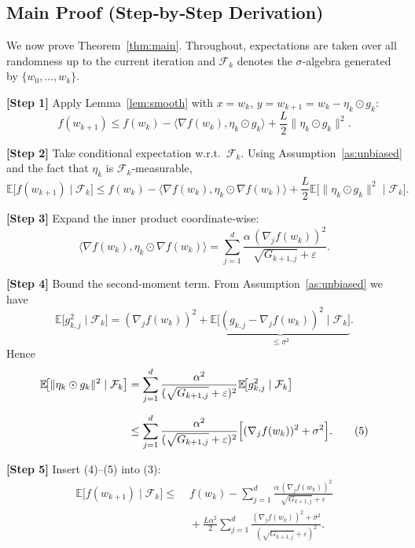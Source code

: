 \documentclass{article}
\newcommand{\E}{\mathbb{E}}
\begin{document}
\subsection*{Main Proof (Step‑by‑Step Derivation)}
We now prove Theorem~\ref{thm:main}.  Throughout, expectations are taken over all
randomness up to the current iteration and $\mathcal{F}_{k}$ denotes the
$\sigma$‑algebra generated by $\{w_{0},\dots,w_{k}\}$.

\noindent\textbf{[Step 1]} Apply Lemma~\ref{lem:smooth} with $x=w_{k}$,
$y=w_{k+1}=w_{k}-\eta_{k}\odot g_{k}$:
\[
f(w_{k+1})\le f(w_{k})-\langle\nabla f(w_{k}),\eta_{k}\odot g_{k}\rangle
      +\frac{L}{2}\|\eta_{k}\odot g_{k}\|^{2}.                                   \tag{2}
\]

\noindent\textbf{[Step 2]} Take conditional expectation w.r.t.\ $\mathcal{F}_{k}$.
Using Assumption~\ref{as:unbiased} and the fact that $\eta_{k}$ is $\mathcal{F}_{k}$‑measurable,
\[
\E\!\bigl[f(w_{k+1})\mid\mathcal{F}_{k}\bigr]
\le f(w_{k})
    -\langle\nabla f(w_{k}),\eta_{k}\odot\nabla f(w_{k})\rangle
    +\frac{L}{2}\E\!\bigl[\|\eta_{k}\odot g_{k}\|^{2}\mid\mathcal{F}_{k}\bigr].
                                                                    \tag{3}
\]

\noindent\textbf{[Step 3]} Expand the inner product coordinate‑wise:
\[
\langle\nabla f(w_{k}),\eta_{k}\odot\nabla f(w_{k})\rangle
   =\sum_{j=1}^{d}\frac{\alpha\,(\nabla_{j}f(w_{k}))^{2}}
                {\sqrt{G_{k+1,j}}+\varepsilon}.                                   \tag{4}
\]

\noindent\textbf{[Step 4]} Bound the second‑moment term.
From Assumption~\ref{as:unbiased} we have
\[
\E\!\bigl[g_{k,j}^{2}\mid\mathcal{F}_{k}\bigr]
   =(\nabla_{j}f(w_{k}))^{2}+\underbrace{\E\!\bigl[(g_{k,j}-\nabla_{j}f(w_{k}))^{2}\mid\mathcal{F}_{k}\bigr]}_{\le\sigma^{2}} .
\]
Hence
\[
\begin{aligned}
\E\!\bigl[\|\eta_{k}\odot g_{k}\|^{2}\mid\mathcal{F}_{k}\bigr]
&=\sum_{j=1}^{d}\frac{\alpha^{2}}{(\sqrt{G_{k+1,j}}+\varepsilon)^{2}}
   \E\!\bigl[g_{k,j}^{2}\mid\mathcal{F}_{k}\bigr] \\[2mm]
&\le\sum_{j=1}^{d}\frac{\alpha^{2}}{(\sqrt{G_{k+1,j}}+\varepsilon)^{2}}
   \Bigl[(\nabla_{j}f(w_{k}))^{2}+\sigma^{2}\Bigr] .                     \tag{5}
\end{aligned}
\]

\noindent\textbf{[Step 5]} Insert (4)–(5) into (3):
\[
\begin{aligned}
\E\!\bigl[f(w_{k+1})\mid\mathcal{F}_{k}\bigr]
\le&\; f(w_{k})
   -\sum_{j=1}^{d}\frac{\alpha\,(\nabla_{j}f(w_{k}))^{2}}
                {\sqrt{G_{k+1,j}}+\varepsilon}  \\
   &\;+\frac{L\alpha^{2}}{2}
      \sum_{j=1}^{d}\frac{(\nabla_{j}f(w_{k}))^{2}+\sigma^{2}}
                {(\sqrt{G_{k+1,j}}+\varepsilon)^{2}} .                     \tag{6}
\end{aligned}
\]
\end{document}
